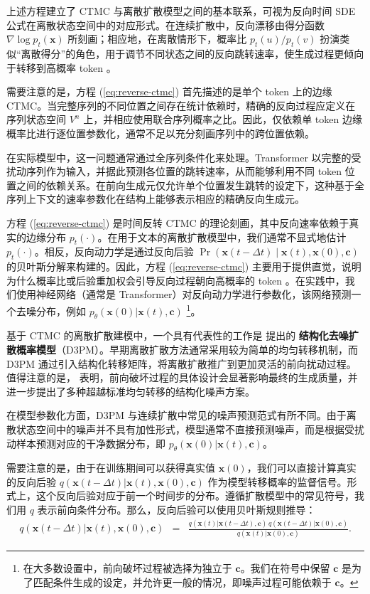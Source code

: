 \documentclass[UTF8,a4paper,zihao=-4,oneside,openany]{ctexbook}
\begin{document}
上述方程建立了 CTMC 与离散扩散模型之间的基本联系，可视为反向时间 SDE 公式在离散状态空间中的对应形式。在连续扩散中，反向漂移由得分函数 $\nabla \log p_t(\mathbf{x})$ 所刻画；相应地，在离散情形下，概率比 $p_t(u)/p_t(v)$ 扮演类似“离散得分”的角色，用于调节不同状态之间的反向跳转速率，使生成过程更倾向于转移到高概率 token 。

需要注意的是，方程 (\ref{eq:reverse-ctmc}) 首先描述的是单个 token 上的边缘 CTMC。当完整序列的不同位置之间存在统计依赖时，精确的反向过程应定义在序列状态空间 $V^n$ 上，并相应使用联合序列概率之比。因此，仅依赖单 token 边缘概率比进行逐位置参数化，通常不足以充分刻画序列中的跨位置依赖。

在实际模型中，这一问题通常通过全序列条件化来处理。Transformer 以完整的受扰动序列作为输入，并据此预测各位置的跳转速率，从而能够利用不同 token 位置之间的依赖关系。在前向生成元仅允许单个位置发生跳转的设定下，这种基于全序列上下文的速率参数化在结构上能够表示相应的精确反向生成元。


方程 (\ref{eq:reverse-ctmc}) 是时间反转 CTMC 的理论刻画，其中反向速率依赖于真实的边缘分布 $p_t(\cdot)$。在用于文本的离散扩散模型中，我们通常不显式地估计 $p_t(\cdot)$。相反，反向动力学是通过反向后验 $\Pr(\mathbf{x}(t-\Delta t)\mid \mathbf{x}(t),\mathbf{x}(0),\mathbf{c})$ 的贝叶斯分解来构建的。因此，方程 (\ref{eq:reverse-ctmc}) 主要用于提供直觉，说明为什么概率比或后验重加权会引导反向过程朝向高概率的 token 。在实践中，我们使用神经网络（通常是 Transformer）对反向动力学进行参数化，该网络预测一个去噪分布，例如 $p_\theta(\mathbf{x}(0)| \mathbf{x}(t),\mathbf{c})$ \footnote{在大多数设置中，前向破坏过程被选择为独立于 $\mathbf{c}$。我们在符号中保留 $\mathbf{c}$ 是为了匹配条件生成的设定，并允许更一般的情况，即噪声过程可能依赖于 $\mathbf{c}$。}。

基于 CTMC 的离散扩散建模中，一个具有代表性的工作是 \citet{austin-etal:2021structured} 提出的 \textbf{结构化去噪扩散概率模型}（D3PM）。早期离散扩散方法通常采用较为简单的均匀转移机制，而 D3PM 通过引入结构化转移矩阵，将离散扩散推广到更加灵活的前向扰动过程。值得注意的是，\citet{austin-etal:2021structured} 表明，前向破坏过程的具体设计会显著影响最终的生成质量，并进一步提出了多种超越标准均匀转移的结构化噪声方案。

在模型参数化方面，D3PM 与连续扩散中常见的噪声预测范式有所不同。由于离散状态空间中的噪声并不具有加性形式，模型通常不直接预测噪声，而是根据受扰动样本预测对应的干净数据分布，即
$p_\theta(\mathbf{x}(0) | \mathbf{x}(t), \mathbf{c})$。

需要注意的是，由于在训练期间可以获得真实值 $\mathbf{x}(0)$，我们可以直接计算真实的反向后验 $q(\mathbf{x}(t - \Delta t) | \mathbf{x}(t), \mathbf{x}(0), \mathbf{c})$ 作为模型转移概率的监督信号。形式上，这个反向后验对应于前一个时间步的分布。遵循扩散模型中的常见符号，我们用 $q$ 表示前向条件分布。那么，反向后验可以使用贝叶斯规则推导：
\begin{eqnarray}
q(\mathbf{x}(t - \Delta t) | \mathbf{x}(t), \mathbf{x}(0), \mathbf{c}) & = & \frac{q(\mathbf{x}(t) | \mathbf{x}(t - \Delta t), \mathbf{c}) \, q(\mathbf{x}(t - \Delta t) | \mathbf{x}(0), \mathbf{c})}{q(\mathbf{x}(t) | \mathbf{x}(0), \mathbf{c})}.
\end{eqnarray}
\end{document}
